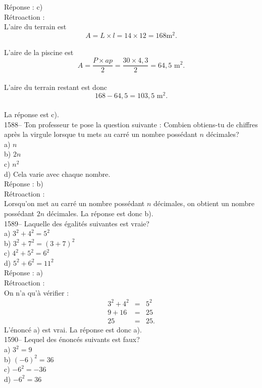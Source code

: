 R\'eponse : c)\\

R\'etroaction :\\
L'aire du terrain est $$A=L\times l=14\times 12=168{\textrm{
m}}^2.$$\\ L'aire de la piscine est $$A=\frac{P\times
ap}{2}=\frac{30\times 4,3}{2}=64,5{\textrm{ m}}^2.$$\\
L'aire du terrain restant est donc
$$168-64,5=103,5{\textrm{ m}}^2.$$\\
La r\'eponse est c).\\

1588-- Ton professeur te pose la question suivante : Combien
obtiens-tu de chiffres apr\`es la virgule lorsque tu mets au carr\'e
un nombre poss\'edant
$n$ d\'ecimales? \\
a) $n$\\
b) $2n$\\
c) $n^2$\\
d) Cela varie avec chaque nombre.\\

R\'eponse : b)\\

R\'etroaction :\\
Lorsqu'on met au carr\'e un nombre poss\'edant $n$ d\'ecimales, on
obtient un nombre poss\'edant $2n$ d\'ecimales. La r\'eponse est donc b).\\

1589-- Laquelle des \'egalit\'es suivantes est vraie?\\
a) $3^2+4^2=5^2$\\
b) $3^2+7^2=(3+7)^2$ \\
c) $4^2+5^2=6^2$\\
d) $5^2+6^2=11^2$\\

R\'eponse : a)\\

R\'etroaction :\\
On n'a qu'\`a v\'erifier :
\begin{eqnarray*}
3^2+4^2&=&5^2 \\ 9+16&=&25 \\ 25&=&25.
\end{eqnarray*}
L'\'enonc\'e a) est vrai. La r\'eponse est donc a).\\

1590-- Lequel des \'enonc\'es suivants est faux?\\
a) $3^2=9$\\
b) $(-6)^2=36$ \\
c) $-6^2=-36$\\
d) $-6^2=36$\\


